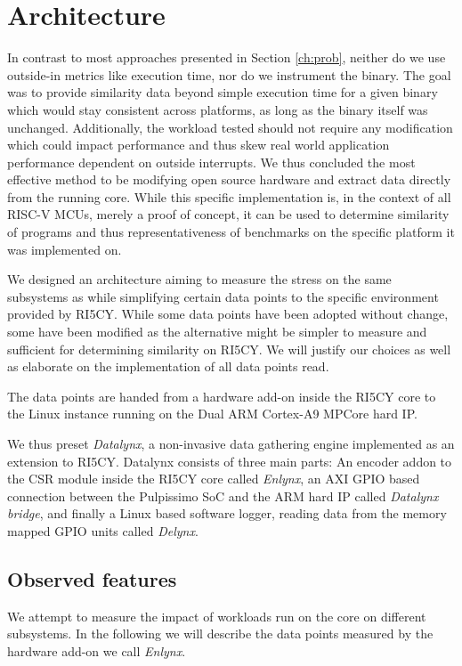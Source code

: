 \documentclass[../bachelor_paper.tex]{subfiles}
\begin{document}
\chapter{Architecture}
    \label{ch:arch}
In contrast to most approaches presented in Section \ref{ch:prob}, neither do we use outside-in metrics like execution time, nor do we instrument the binary. The goal was to provide similarity data beyond simple execution time for a given binary which would stay consistent across platforms, as long as the binary itself was unchanged. Additionally, the workload tested should not require any modification which could impact performance and thus skew real world application performance dependent on outside interrupts. We thus concluded the most effective method to be modifying open source hardware and extract data directly from the running core. While this specific implementation is, in the context of all RISC-V \acp{MCU}, merely a proof of concept, it can be used to determine similarity of programs and thus representativeness of benchmarks on the specific platform it was implemented on.

We designed an architecture aiming to measure the stress on the same subsystems as \cite{phansalkarMeasuringProgramSimilarity2005,joshiMeasuringBenchmarkSimilarity2006,eeckhoutQuantifyingImpactInput} while simplifying certain data points to the specific environment provided by RI5CY. While some data points have been adopted without change, some have been modified as the alternative might be simpler to measure and sufficient for determining similarity on RI5CY. We will justify our choices as well as elaborate on the implementation of all data points read.

The data points are handed from a hardware add-on inside the RI5CY core to the Linux instance running on the Dual ARM Cortex-A9 MPCore hard \ac{IP}.

We thus preset \emph{Datalynx}, a non-invasive data gathering engine implemented as an extension to RI5CY. Datalynx consists of three main parts: An encoder addon to the \ac{CSR} module inside the RI5CY core called \emph{Enlynx}, an AXI GPIO based connection between the Pulpissimo \ac{SoC} and the ARM hard \ac{IP} called \emph{Datalynx bridge}, and finally a Linux based software logger, reading data from the memory mapped GPIO units called \emph{Delynx}.

\section{Observed features}
We attempt to measure the impact of workloads run on the core on different subsystems. In the following we will describe the data points measured by the hardware add-on we call \emph{Enlynx}.
\end{document}
